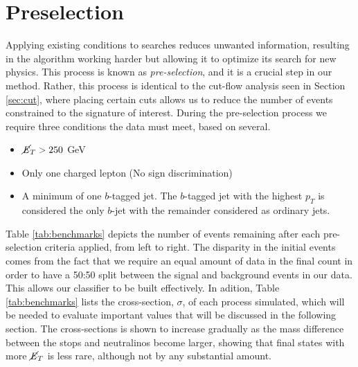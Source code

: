 \section{Preselection}
Applying existing conditions to searches reduces unwanted information, resulting in the algorithm working harder but allowing it to optimize its search for new physics. This process is known as \textit{pre-selection}, and it is a crucial step in our method. Rather, this process is identical to the cut-flow analysis seen in Section \ref{sec:cut}, where placing certain cuts allows us to reduce the number of events constrained to the signature of interest. During the pre-selection process we require three conditions the data must meet, based on several. 
\begin{itemize}
    \item $\cancel{\it{E}}_{T}>250$ GeV
    \item Only one charged lepton (No sign discrimination)
    \item A minimum of one $b$-tagged jet. The $b$-tagged jet with the highest $p_T$ is considered the only $b$-jet with the remainder considered as ordinary jets.\\
\end{itemize}

Table \ref{tab:benchmarks} depicts the number of events remaining after each pre-selection criteria applied, from left to right. The disparity in the initial events comes from the fact that we require an equal amount of data in the final count in order to have a 50:50 split between the signal and background events in our data. This allows our classifier to be built effectively. In adition, Table \ref{tab:benchmarks} lists the cross-section, $\sigma$, of each process simulated, which will be needed to evaluate important values that will be discussed in the following section. The cross-sections is shown to increase gradually as the mass difference between the stops and neutralinos become larger, showing that final states with more $\cancel{\it{E}}_{T}$ is less rare, although not by any substantial amount. \\

